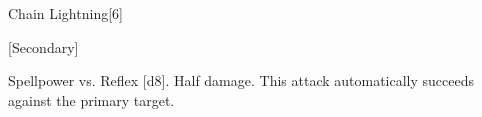 \begin{spellsection}{Chain Lightning}[6]
    \begin{spellheader}
    \end{spellheader}
    \begin{spellcontent}
        \begin{spelltargetinginfo}
            [Secondary]
        \end{spelltargetinginfo}
        \begin{spelleffects}
            \begin{spellattack}{Spellpower vs. Reflex}
                \spellsuccess {}[d8].
                \spellfailure Half damage.
                \spellspecial This attack automatically succeeds against the primary target.
            \end{spellattack}
        \end{spelleffects}
    \end{spellcontent}
    \begin{spellfooter}
        \miscastexplode
    \end{spellfooter}
    \begin{spellaugments}
    \end{spellaugments}
\end{spellsection}

